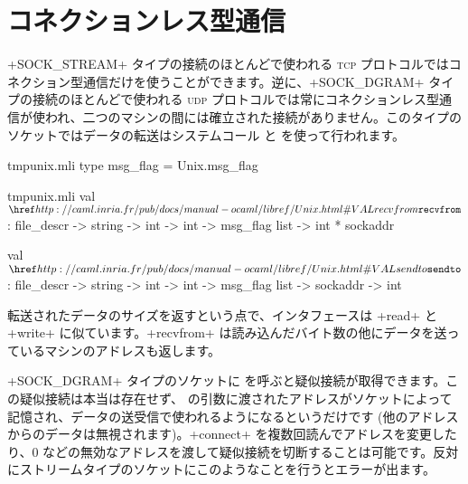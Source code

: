 \section{\label{sec/mode-deconnecte}コネクションレス型通信}

\ml+SOCK_STREAM+ タイプの接続のほとんどで使われる \textsc{tcp} プロトコルではコネクション型通信だけを使うことができます。逆に、\ml+SOCK_DGRAM+ タイプの接続のほとんどで使われる \textsc{udp} プロトコルでは常にコネクションレス型通信が使われ、二つのマシンの間には確立された接続がありません。このタイプのソケットではデータの転送はシステムコール  と  を使って行われます。
%
\begin{codefile}{tmpunix.mli}
type msg_flag = Unix.msg_flag
\end{codefile}
%
\begin{listingcodefile}{tmpunix.mli}
val $\libvalue{Unix}{recvfrom}$ :
  file_descr -> string -> int -> int -> msg_flag list -> int * sockaddr

val $\libvalue{Unix}{sendto}$ :
  file_descr -> string -> int -> int -> msg_flag list -> sockaddr -> int
\end{listingcodefile}
%
転送されたデータのサイズを返すという点で、インタフェースは \ml+read+ と \ml+write+ に似ています。\ml+recvfrom+ は読み込んだバイト数の他にデータを送っているマシンのアドレスも返します。

\ml+SOCK_DGRAM+ タイプのソケットに  を呼ぶと疑似接続が取得できます。この疑似接続は本当は存在せず、  の引数に渡されたアドレスがソケットによって記憶され、データの送受信で使われるようになるというだけです (他のアドレスからのデータは無視されます)。\ml+connect+ を複数回読んでアドレスを変更したり、0 などの無効なアドレスを渡して疑似接続を切断することは可能です。反対にストリームタイプのソケットにこのようなことを行うとエラーが出ます。

